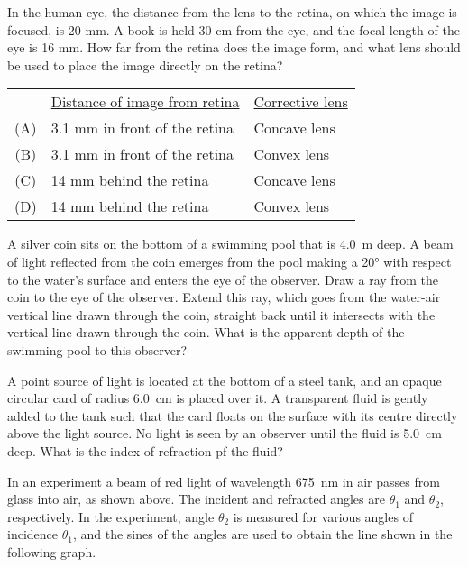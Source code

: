 \documentclass{../../oss-apphys-exam}
\begin{document}
\begin{questions}
  \question In the human eye, the distance from the lens to the retina, on
  which the image is focused, is 20 mm. A book is held 30 cm from the eye, and
  the focal length of the eye is 16 mm. How far from the retina does the
  image form, and what lens should be used to place the image directly
  on the retina?
   
  \begin{tabular}{cll}
    & \underline{Distance of image from retina}
    & \underline{Corrective lens} \\
    (A) & 3.1 mm in front of the retina & Concave lens \\
    (B) & 3.1 mm in front of the retina & Convex lens \\
    (C) & 14 mm behind the retina & Concave lens \\
    (D) & 14 mm behind the retina & Convex lens
  \end{tabular}
  \newpage

  \classkickFRQinstructions
  
  \question A silver coin sits on the bottom of a swimming pool that is
  \SI{4.0}{\metre} deep. A beam of light reflected from the coin emerges from
  the pool making a \ang{20} with respect to the water's surface and enters the
  eye of the observer. Draw a ray from the coin to the eye of the observer.
  Extend this ray, which goes from the water-air vertical line drawn through
  the coin, straight back until it intersects with the vertical line drawn
  through the coin. What is the apparent depth of the swimming pool to this
  observer?
  \vspace{\stretch1}
  
  \question A point source of light is located at the bottom of a steel tank,
  and an opaque circular card of radius \SI{6.0}{\centi\metre} is placed over
  it. A transparent fluid is gently added to the tank such that the card floats
  on the surface with its centre directly above the light source. No light is
  seen by an observer until the fluid is \SI{5.0}{\centi\metre} deep. What is
  the index of refraction pf the fluid?
  \vspace{\stretch1}
  \newpage

  

  \question In an experiment a beam of red light of wavelength
  \SI{675}{\nano\metre} in air passes from glass into air, as shown above. The
  incident and refracted angles are $\theta_1$ and $\theta_2$, respectively. In
  the experiment, angle $\theta_2$ is measured for various angles of incidence
  $\theta_1$, and the sines of the angles are used to obtain the line shown in
  the following graph.
  

\end{questions}
\end{document}
